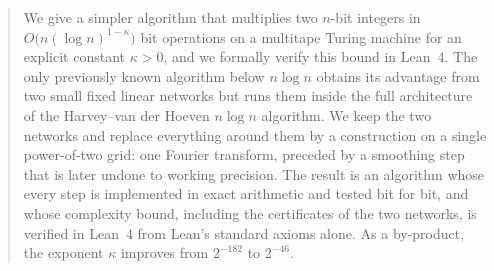 \begin{abstract}
We give a simpler algorithm that multiplies two $n$-bit integers in $O\bigl(n(\log n)^{1-\kappa}\bigr)$ bit operations on a multitape Turing machine for an explicit constant $\kappa>0$, and we formally verify this bound in Lean~4. The only previously known algorithm below $n\log n$ obtains its advantage from two small fixed linear networks but runs them inside the full architecture of the Harvey--van der Hoeven $n\log n$ algorithm. We keep the two networks and replace everything around them by a construction on a single power-of-two grid: one Fourier transform, preceded by a smoothing step that is later undone to working precision. The result is an algorithm whose every step is implemented in exact arithmetic and tested bit for bit, and whose complexity bound, including the certificates of the two networks, is verified in Lean~4 from Lean's standard axioms alone. As a by-product, the exponent $\kappa$ improves from $2^{-182}$ to $2^{-46}$.
\end{abstract}
